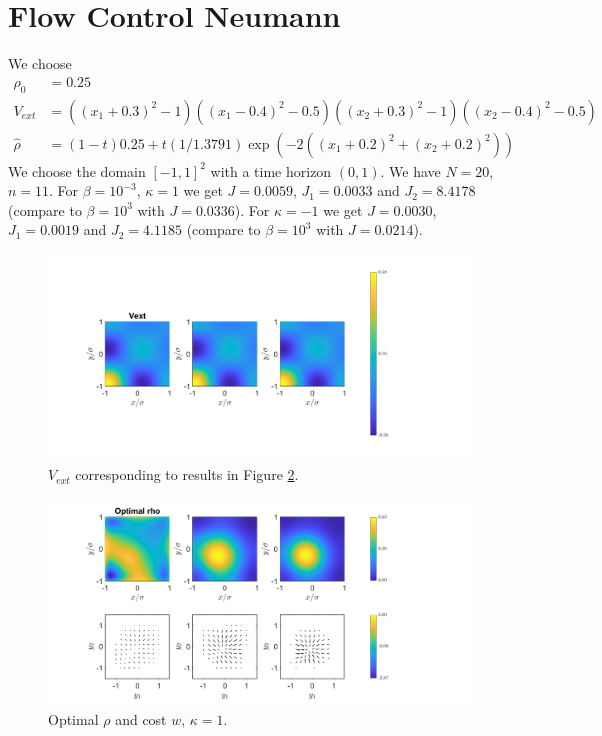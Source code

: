 \documentclass[11pt, a4paper]{article}
\theoremstyle{definition}
\newcommand{\hr}{\widehat \rho}
\begin{document}
	\section*{Flow Control Neumann}
	We choose 
	\begin{align*}
		\rho_0 &= 0.25\\
		V_{ext} &= ((x_1 + 0.3)^2 - 1)((x_1-0.4)^2 - 0.5)
		((x_2 + 0.3)^2 - 1)((x_2-0.4)^2 - 0.5)\\
		\hr &= (1-t)0.25 + t(1/1.3791)\exp{(-2((x_1+0.2)^2 + (x_2+0.2)^2))}
	\end{align*}
	We choose the domain $[-1,1]^2$ with a time horizon $(0,1)$. We have $N = 20$, $n = 11$. 
	For $\beta = 10^{-3}$, $\kappa = 1$ we get $J = 0.0059$, $J_1 = 0.0033$ and $J_2 = 8.4178$ (compare to $\beta = 10^3$ with $J = 0.0336$). For $\kappa = - 1$ we get $J = 0.0030$, $J_1 = 0.0019$ and $J_2 = 4.1185$ (compare to $\beta = 10^3$ with $J = 0.0214$).
		\begin{figure}[h]
		\centering
		\includegraphics[scale=0.35]{VextEx4.png}
		\caption{$V_{ext}$ corresponding to results in Figure \ref{F3}.} 
		\label{F3a}
	\end{figure}
	\begin{figure}[h]
		\centering
		\includegraphics[scale=0.35]{FCEx2k1.png}
		\caption{Optimal $\rho$ and cost $w$, $\kappa = 1$.} 
		\label{F3}
	\end{figure}
\end{document}
